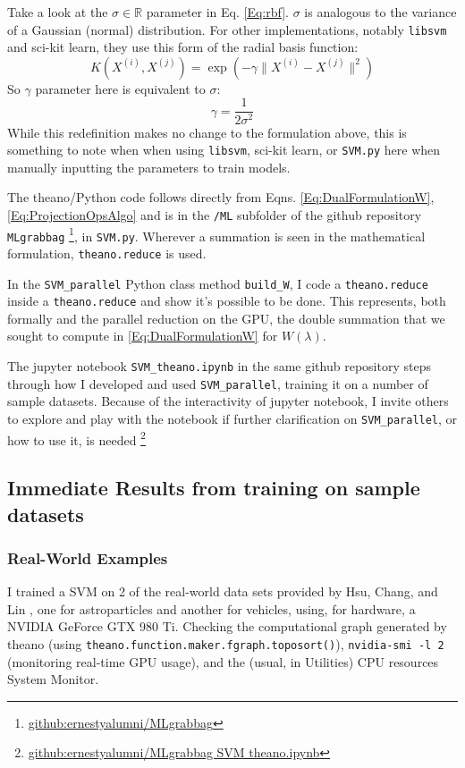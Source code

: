 \documentclass[10pt]{amsart}
\begin{document}
\begin{multicols*}{2}
Take a look at the $\sigma \in \mathbb{R}$ parameter in Eq. \ref{Eq:rbf}.  $\sigma$ is analogous to the variance of a Gaussian (normal) distribution.  For other implementations, notably \verb|libsvm| and sci-kit learn, they use this form of the radial basis function:
\[
K(X^{(i)}, X^{(j)}) = \exp{ \left( - \gamma  \| X^{(i)} - X^{(j)} \|^2  \right) } 
\]
So $\gamma$ parameter here is equivalent to $\sigma$:
\[
\gamma = \frac{1}{2\sigma^2}
\]
While this redefinition makes no change to the formulation above, this is something to note when when using \verb|libsvm|, sci-kit learn, or \verb|SVM.py| here when manually inputting the parameters to train models.  


The theano/Python code follows directly from Eqns. \ref{Eq:DualFormulationW}, \ref{Eq:ProjectionOpsAlgo} and is in the \verb|/ML| subfolder of the github repository \verb|MLgrabbag| \footnote{\href{https://github.com/ernestyalumni/MLgrabbag/tree/master/ML}{github:ernestyalumni/MLgrabbag}}, in \verb|SVM.py|.  Wherever a summation is seen in the mathematical formulation, \verb|theano.reduce| is used.  

In the \verb|SVM_parallel| Python class method \verb|build_W|, I code a \verb|theano.reduce| inside a \verb|theano.reduce| and show it's possible to be done.  This represents, both formally and the parallel reduction on the GPU, the double summation that we sought to compute in \ref{Eq:DualFormulationW} for $W(\lambda)$.

The jupyter notebook \verb|SVM_theano.ipynb| in the same github repository steps through how I developed and used \verb|SVM_parallel|, training it on a number of sample datasets.  Because of the interactivity of jupyter notebook, I invite others to explore and play with the notebook if further clarification on \verb|SVM_parallel|, or how to use it, is needed \footnote{\href{https://github.com/ernestyalumni/MLgrabbag/blob/master/SVM_theano.ipynb}{github:ernestyalumni/MLgrabbag SVM theano.ipynb}}

\subsection{Immediate Results from training on sample datasets} \label{SubSec:ResultsSampleDatasets}

\subsubsection{Real-World Examples}

I trained a SVM on 2 of the real-world data sets provided by Hsu, Chang, and Lin \cite{HCL}, one for astroparticles and another for vehicles, using, for hardware, a NVIDIA GeForce GTX 980 Ti.  Checking the computational graph generated by theano (using \verb|theano.function.maker.fgraph.toposort()|), \verb|nvidia-smi -l 2| (monitoring real-time GPU usage), and the (usual, in Utilities) CPU resources System Monitor.


\end{multicols*}
\end{document}
